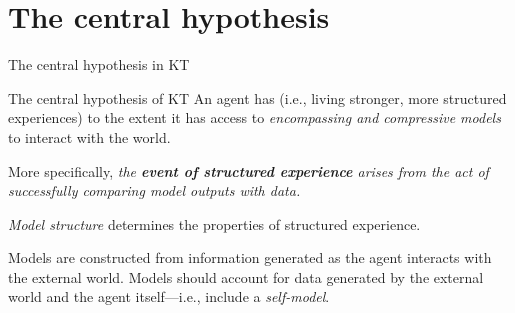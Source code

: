 \section{The central hypothesis}

\begin{frame}[label=ladila]{The central hypothesis in KT}

\begin{exampleblock}{The central hypothesis of KT}
An agent has \SEP (i.e., living stronger, more structured experiences) to the extent it has access to {\em encompassing and compressive models}  to interact with the world.  

\vspace{0.5cm}

More specifically,  {\em the \textbf{event of structured experience} arises from the act of successfully comparing model outputs with data.}
\vspace{0.5cm}

\textit{Model structure} determines the properties of structured experience. \vspace{0.5cm}

\end{exampleblock}
 \vfill
   Models are constructed from information generated as the agent interacts with the external world. Models should account for data generated by the external world and the agent itself---i.e., include a {\em self-model}.

 

\end{frame}

 
    
    
    
 



